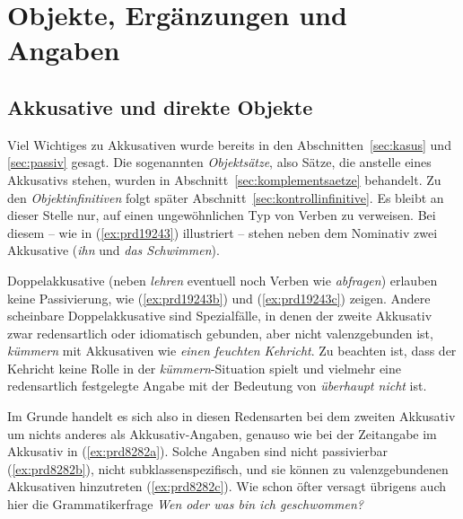 \section{Objekte, Ergänzungen und Angaben}

\label{sec:objekte}

\subsection{Akkusative und direkte Objekte}


Viel Wichtiges zu Akkusativen wurde bereits in den Abschnitten~\ref{sec:kasus} und \ref{sec:passiv} gesagt.
Die sogenannten \textit{Objektsätze}, also Sätze, die anstelle eines Akkusativs stehen, wurden in Abschnitt~\ref{sec:komplementsaetze} behandelt.
Zu den \textit{Objektinfinitiven} folgt später Abschnitt~\ref{sec:kontrollinfinitive}.
Es bleibt an dieser Stelle nur, auf einen ungewöhnlichen Typ von Verben zu verweisen.
Bei diesem -- wie in (\ref{ex:prd19243}) illustriert -- stehen neben dem Nominativ zwei Akkusative (\textit{ihn} und \textit{das Schwimmen}).

\begin{exe}
  \ex\label{ex:prd19243}
  \begin{xlist}
  \end{xlist}
\end{exe}


Doppelakkusative (neben \textit{lehren} eventuell noch Verben wie \textit{abfragen}) erlauben keine Passivierung, wie (\ref{ex:prd19243b}) und (\ref{ex:prd19243c}) zeigen.
Andere scheinbare Doppelakkusative sind Spezialfälle, in denen der zweite Akkusativ zwar redensartlich oder idiomatisch gebunden, aber nicht valenzgebunden ist, \zB \textit{kümmern} mit Akkusativen wie \textit{einen feuchten Kehricht}.
Zu beachten ist, dass der Kehricht keine Rolle in der \textit{kümmern}-Situation spielt und vielmehr eine redensartlich festgelegte Angabe mit der Bedeutung von \textit{überhaupt nicht} ist.


Im Grunde handelt es sich also in diesen Redensarten bei dem zweiten Akkusativ um nichts anderes als Akkusativ-Angaben, genauso wie bei der Zeitangabe im Akkusativ in (\ref{ex:prd8282a}).
Solche Angaben sind nicht passivierbar (\ref{ex:prd8282b}), nicht subklassenspezifisch, und sie können zu valenzgebundenen Akkusativen hinzutreten (\ref{ex:prd8282c}).
Wie schon öfter versagt übrigens auch hier die Grammatikerfrage \textit{Wen oder was bin ich geschwommen?}

